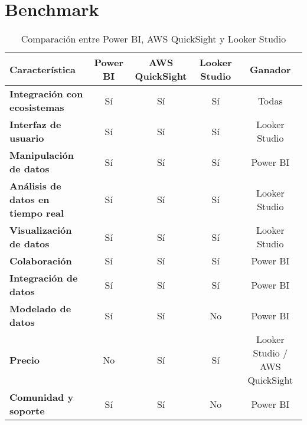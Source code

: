 \section{Benchmark}

\begin{table}[h!]
\centering
\caption{Comparación entre Power BI, AWS QuickSight y Looker Studio}
\renewcommand{\arraystretch}{1.5} %
\setlength{\tabcolsep}{5pt} %
\begin{tabular}{|l|c|c|c|c|}
\hline
\textbf{Característica} & \textbf{Power BI} & \textbf{AWS QuickSight} & \textbf{Looker Studio} & \textbf{Ganador} \\ \hline
\textbf{Integración con ecosistemas} & Sí & Sí & Sí & Todas \\ \hline
\textbf{Interfaz de usuario} & Sí & Sí & Sí & Looker Studio \\ \hline
\textbf{Manipulación de datos} & Sí & Sí & Sí & Power BI \\ \hline
\textbf{Análisis de datos en tiempo real} & Sí & Sí & Sí & Looker Studio \\ \hline
\textbf{Visualización de datos} & Sí & Sí & Sí & Looker Studio \\ \hline
\textbf{Colaboración} & Sí & Sí & Sí & Power BI \\ \hline
\textbf{Integración de datos} & Sí & Sí & Sí & Power BI \\ \hline
\textbf{Modelado de datos} & Sí & Sí & No & Power BI \\ \hline
\textbf{Precio} & No & Sí & Sí & Looker Studio / AWS QuickSight \\ \hline
\textbf{Comunidad y soporte} & Sí & Sí & No & Power BI \\ \hline
\end{tabular}
\end{table}
    